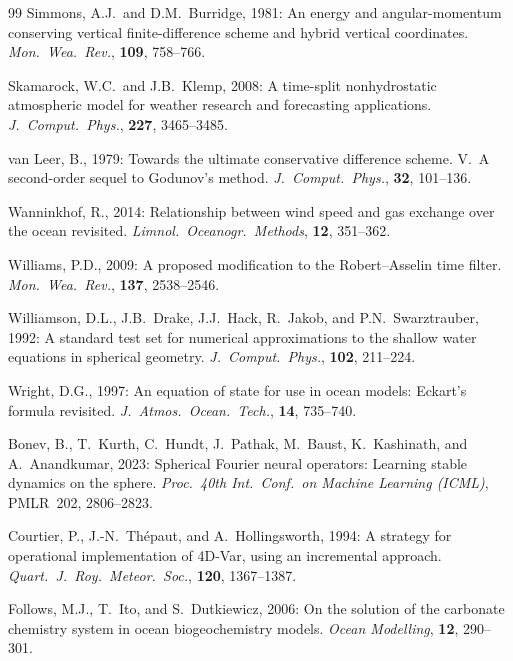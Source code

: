 \documentclass[11pt,a4paper]{article}
\begin{document}
\begin{thebibliography}{99}
Simmons, A.J.\ and D.M.~Burridge, 1981:
An energy and angular-momentum conserving vertical finite-difference
scheme and hybrid vertical coordinates.
\textit{Mon.\ Wea.\ Rev.}, \textbf{109}, 758--766.

Skamarock, W.C.\ and J.B.~Klemp, 2008:
A time-split nonhydrostatic atmospheric model for weather research and
forecasting applications.
\textit{J.\ Comput.\ Phys.}, \textbf{227}, 3465--3485.

van Leer, B., 1979:
Towards the ultimate conservative difference scheme. V.\ A second-order
sequel to Godunov's method.
\textit{J.\ Comput.\ Phys.}, \textbf{32}, 101--136.

Wanninkhof, R., 2014:
Relationship between wind speed and gas exchange over the ocean revisited.
\textit{Limnol.\ Oceanogr.\ Methods}, \textbf{12}, 351--362.

Williams, P.D., 2009:
A proposed modification to the Robert--Asselin time filter.
\textit{Mon.\ Wea.\ Rev.}, \textbf{137}, 2538--2546.

Williamson, D.L., J.B.~Drake, J.J.~Hack, R.~Jakob, and P.N.~Swarztrauber, 1992:
A standard test set for numerical approximations to the shallow water
equations in spherical geometry.
\textit{J.\ Comput.\ Phys.}, \textbf{102}, 211--224.

Wright, D.G., 1997:
An equation of state for use in ocean models: Eckart's formula revisited.
\textit{J.\ Atmos.\ Ocean.\ Tech.}, \textbf{14}, 735--740.

Bonev, B., T.~Kurth, C.~Hundt, J.~Pathak, M.~Baust, K.~Kashinath, and
A.~Anandkumar, 2023:
Spherical Fourier neural operators: Learning stable dynamics on the sphere.
\textit{Proc.\ 40th Int.\ Conf.\ on Machine Learning (ICML)}, PMLR~202,
2806--2823.

Courtier, P., J.-N.~Th\'epaut, and A.~Hollingsworth, 1994:
A strategy for operational implementation of 4D-Var, using an incremental
approach.
\textit{Quart.\ J.\ Roy.\ Meteor.\ Soc.}, \textbf{120}, 1367--1387.

Follows, M.J., T.~Ito, and S.~Dutkiewicz, 2006:
On the solution of the carbonate chemistry system in ocean biogeochemistry
models.
\textit{Ocean Modelling}, \textbf{12}, 290--301.


\end{thebibliography}
\end{document}
